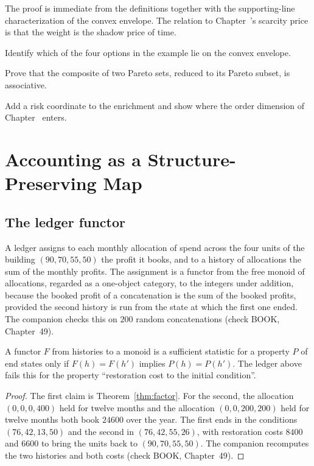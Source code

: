 The proof is immediate from the definitions together with the supporting-line characterization of the convex envelope. The relation to Chapter~'s scarcity price is that the weight is the shadow price of time.

\begin{exercise}Identify which of the four options in the example lie on the convex envelope.\end{exercise}
\begin{exercise}Prove that the composite of two Pareto sets, reduced to its Pareto subset, is associative.\end{exercise}
\begin{exercise}Add a risk coordinate to the enrichment and show where the order dimension of Chapter~ enters.\end{exercise}

\chapter{Accounting as a Structure-Preserving Map}\label{ch:49}

\section{The ledger functor}

A ledger assigns to each monthly allocation of spend across the four units of the building $(90,70,55,50)$ the profit it books, and to a history of allocations the sum of the monthly profits. The assignment is a functor from the free monoid of allocations, regarded as a one-object category, to the integers under addition, because the booked profit of a concatenation is the sum of the booked profits, provided the second history is run from the state at which the first one ended. The companion checks this on $200$ random concatenations (check BOOK, Chapter~49).

\begin{proposition}\label{prop:insuff}
A functor $F$ from histories to a monoid is a sufficient statistic for a property $P$ of end states only if $F(h)=F(h')$ implies $P(h)=P(h')$. The ledger above fails this for the property ``restoration cost to the initial condition''.
\end{proposition}

\begin{proof}
The first claim is Theorem~\ref{thm:factor}. For the second, the allocation $(0,0,0,400)$ held for twelve months and the allocation $(0,0,200,200)$ held for twelve months both book $24600$ over the year. The first ends in the conditions $(76,42,13,50)$ and the second in $(76,42,55,26)$, with restoration costs $8400$ and $6600$ to bring the units back to $(90,70,55,50)$. The companion recomputes the two histories and both costs (check BOOK, Chapter~49).
\end{proof}

